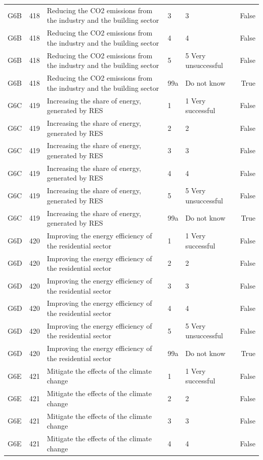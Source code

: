 \begin{tabular}{lrlllr}
G6B & 418 & Reducing the CO2 emissions from the industry and the building sector & 3 & 3 & False \\
G6B & 418 & Reducing the CO2 emissions from the industry and the building sector & 4 & 4 & False \\
G6B & 418 & Reducing the CO2 emissions from the industry and the building sector & 5 & 5 Very unsuccessful & False \\
G6B & 418 & Reducing the CO2 emissions from the industry and the building sector & 99a & Do not know & True \\
G6C & 419 & Increasing the share of energy, generated by RES & 1 & 1 Very successful & False \\
G6C & 419 & Increasing the share of energy, generated by RES & 2 & 2 & False \\
G6C & 419 & Increasing the share of energy, generated by RES & 3 & 3 & False \\
G6C & 419 & Increasing the share of energy, generated by RES & 4 & 4 & False \\
G6C & 419 & Increasing the share of energy, generated by RES & 5 & 5 Very unsuccessful & False \\
G6C & 419 & Increasing the share of energy, generated by RES & 99a & Do not know & True \\
G6D & 420 & Improving the energy efficiency of the residential sector & 1 & 1 Very successful & False \\
G6D & 420 & Improving the energy efficiency of the residential sector & 2 & 2 & False \\
G6D & 420 & Improving the energy efficiency of the residential sector & 3 & 3 & False \\
G6D & 420 & Improving the energy efficiency of the residential sector & 4 & 4 & False \\
G6D & 420 & Improving the energy efficiency of the residential sector & 5 & 5 Very unsuccessful & False \\
G6D & 420 & Improving the energy efficiency of the residential sector & 99a & Do not know & True \\
G6E & 421 & Mitigate the effects of the climate change & 1 & 1 Very successful & False \\
G6E & 421 & Mitigate the effects of the climate change & 2 & 2 & False \\
G6E & 421 & Mitigate the effects of the climate change & 3 & 3 & False \\
G6E & 421 & Mitigate the effects of the climate change & 4 & 4 & False \\

\end{tabular}
